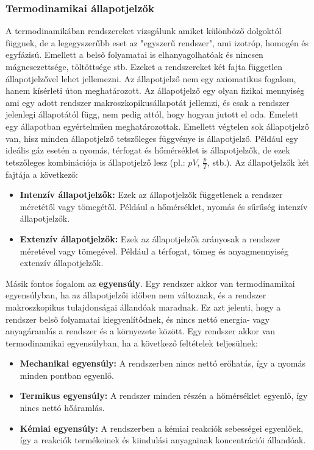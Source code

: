 \documentclass[a4paper,12pt]{article}
\begin{document}
\subsubsection{Termodinamikai állapotjelzők}
A termodinamikában rendszereket vizsgálunk amiket különböző dolgoktól függnek, de a legegyszerűbb eset az "egyszerű rendszer", ami izotróp, homogén és egyfázisú. Emellett a belső folyamatai is elhanyagolhatóak és nincsen mágnesezettsége, töltöttsége stb.
Ezeket a rendszereket két fajta független állapotjelzővel lehet jellemezni. Az állapotjelző nem egy axiomatikus fogalom, hanem kísérleti úton meghatározott.
Az állapotjelző egy olyan fizikai mennyiség ami egy adott rendszer makroszkopikusállapotát jellemzi, és csak a rendszer jelenlegi állapotától függ, nem pedig attól, hogy hogyan jutott el oda. 
Emelett egy állapotban egyértelműen meghatározottak. Emellett végtelen sok állapotjelző van, hisz minden állapotjelző tetszőleges függvénye is állapotjelző. Például egy ideális gáz esetén a nyomás, térfogat és hőmérséklet is állapotjelzők,
de ezek tetszőleges kombinációja is állapotjelző lesz (pl.: $pV$, $\frac{p}{T}$, stb.). Az állapotjelzők két fajtája a következő:
\begin{itemize}
    \item \textbf{Intenzív állapotjelzők:} Ezek az állapotjelzők függetlenek a rendszer méretétől vagy tömegétől. Például a hőmérséklet, nyomás és sűrűség intenzív állapotjelzők.
    \item \textbf{Extenzív állapotjelzők:} Ezek az állapotjelzők arányosak a rendszer méretével vagy tömegével. Például a térfogat, tömeg és anyagmennyiség extenzív állapotjelzők.
\end{itemize}
Másik fontos fogalom az \textbf{egyensúly}. Egy rendszer akkor van termodinamikai egyensúlyban, ha az állapotjelzői időben nem változnak, és a rendszer makroszkopikus tulajdonságai állandóak maradnak. Ez azt jelenti, hogy a rendszer belső folyamatai kiegyenlítődnek, és nincs nettó energia- vagy anyagáramlás a rendszer és a környezete között.
Egy rendszer akkor van termodinamikai egyensúlyban, ha a következő feltételek teljesülnek:
\begin{itemize}
    \item \textbf{Mechanikai egyensúly:} A rendszerben nincs nettó erőhatás, így a nyomás minden pontban egyenlő.
    \item \textbf{Termikus egyensúly:} A rendszer minden részén a hőmérséklet egyenlő, így nincs nettó hőáramlás.
    \item \textbf{Kémiai egyensúly:} A rendszerben a kémiai reakciók sebességei egyenlőek, így a reakciók termékeinek és kiindulási anyagainak koncentrációi állandóak.
\end{itemize}
\end{document}
